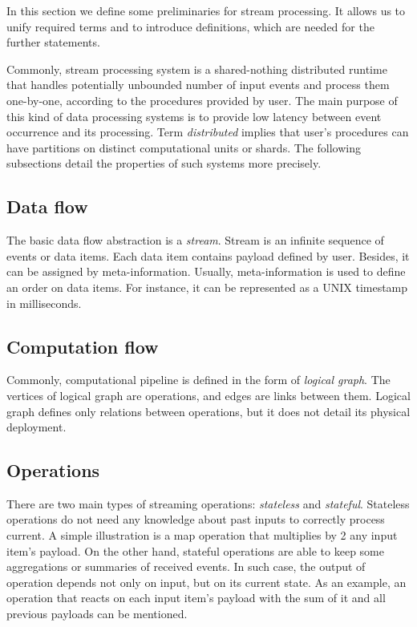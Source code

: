 
\label {fs-stream}

In this section we define some preliminaries for stream processing. It allows us to unify required terms and to introduce definitions, which are needed for the further statements.

Commonly, stream processing system is a shared-nothing distributed runtime that handles potentially unbounded number of input events and process them one-by-one, according to the procedures provided by user. The main purpose of this kind of data processing systems is to provide low latency between event occurrence and its processing. Term {\it distributed} implies that user's procedures can have partitions on distinct computational units or shards. The following subsections detail the properties of such systems more precisely.  

\subsection{Data flow}
The basic data flow abstraction is a {\it stream}. Stream is an infinite sequence of events or data items. Each data item contains payload defined by user. Besides, it can be assigned by meta-information. Usually, meta-information is used to define an order on data items. For instance, it can be represented as a UNIX timestamp in milliseconds.

\subsection{Computation flow}
Commonly, computational pipeline is defined in the form of {\it logical graph}. The vertices of logical graph are operations, and edges are links between them. Logical graph defines only relations between operations, but it does not detail its physical deployment.    

\subsection{Operations}
There are two main types of streaming operations: {\it stateless} and {\it stateful}. Stateless operations do not need any knowledge about past inputs to correctly process current. A simple illustration is a map operation that multiplies by 2 any input item's payload. On the other hand, stateful operations are able to keep some aggregations or summaries of received events. In such case, the output of operation depends not only on input, but on its current state. As an example, an operation that reacts on each input item's payload with the sum of it and all previous payloads can be mentioned. 

